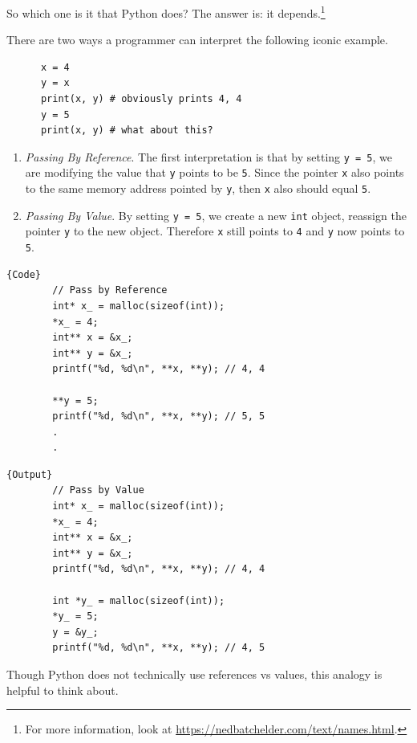   So which one is it that Python does? The answer is: it depends.\footnote{For more information, look at \href{https://nedbatchelder.com/text/names.html}{https://nedbatchelder.com/text/names.html}.} 

  \begin{example}
    \label{ex:pass-by-reference-vs-by-value}
    There are two ways a programmer can interpret the following iconic example.
    \begin{lstlisting}
      x = 4 
      y = x 
      print(x, y) # obviously prints 4, 4
      y = 5
      print(x, y) # what about this? 
    \end{lstlisting}

    \begin{enumerate}
      \item \textit{Passing By Reference}. The first interpretation is that by setting \texttt{y = 5}, we are modifying the value that \texttt{y} points to be \texttt{5}. Since the pointer \texttt{x} also points to the same memory address pointed by \texttt{y}, then \texttt{x} also should equal \texttt{5}. 
      \item \textit{Passing By Value}. By setting \texttt{y = 5}, we create a new \texttt{int} object, reassign the pointer \texttt{y} to the new object. Therefore \texttt{x} still points to \texttt{4} and \texttt{y} now points to \texttt{5}. 
    \end{enumerate}
    \noindent\begin{minipage}{.5\textwidth}
      \begin{lstlisting}[]{Code}
        // Pass by Reference
        int* x_ = malloc(sizeof(int)); 
        *x_ = 4; 
        int** x = &x_; 
        int** y = &x_; 
        printf("%d, %d\n", **x, **y); // 4, 4

        **y = 5; 
        printf("%d, %d\n", **x, **y); // 5, 5
        .
        .
      \end{lstlisting}
      \end{minipage}
      \hfill
      \begin{minipage}{.49\textwidth}
      \begin{lstlisting}[]{Output}
        // Pass by Value
        int* x_ = malloc(sizeof(int)); 
        *x_ = 4; 
        int** x = &x_; 
        int** y = &x_; 
        printf("%d, %d\n", **x, **y); // 4, 4

        int *y_ = malloc(sizeof(int)); 
        *y_ = 5; 
        y = &y_; 
        printf("%d, %d\n", **x, **y); // 4, 5
      \end{lstlisting}
    \end{minipage}

    Though Python does not technically use references vs values, this analogy is helpful to think about.  
  \end{example}

